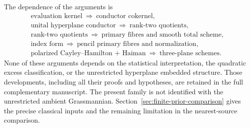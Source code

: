 The dependence of the arguments is
\[
 \begin{gathered}
 \text{evaluation kernel}\ \Longrightarrow\ \text{conductor cokernel},\\
 \text{unital hyperplane conductor}\ \Longrightarrow\ \text{rank-two quotients},\\
 \text{rank-two quotients}\ \Longrightarrow\ \text{primary fibres and smooth total scheme},\\
 \text{index form}\ \Longrightarrow\ \text{pencil primary fibres and normalization},\\
 \text{polarized Cayley--Hamilton + Haiman}\ \Longrightarrow\ \text{three-plane schemes}.
 \end{gathered}
\]
None of these arguments depends on the statistical interpretation,
the quadratic excess classification, or the unrestricted hyperplane
embedded structure. Those developments, including all their proofs
and hypotheses, are retained in the full complementary manuscript.
The present family is not identified with the unrestricted ambient
Grassmannian. Section~\ref{sec:finite-prior-comparison} gives the
precise classical inputs and the remaining limitation in the
nearest-source comparison.
